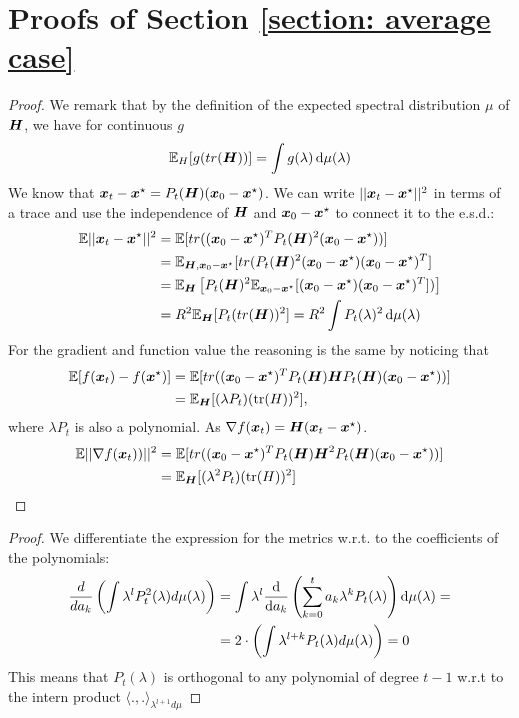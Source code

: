 \documentclass{article}
\begin{document}
\appendix
\newpage
\section{Proofs of Section \ref{section: average case}}

\metrics*
\begin{proof}
\newcommand\xinit{\xx_0-\xx^\star}
We remark that by the definition of the expected spectral distribution $\mu$ of ${\boldsymbol H}$, we have for continuous $g$
\begin{equation}
    {\mathbb{E}}_H[g(tr({\boldsymbol H}))]=\int g(\lambda)\mathop{}\!\mathrm{d} \mu(\lambda) 
\end{equation}
We know that $\xx_t-\xx^\star=P_t(\HH)(\xinit)$. We can write $||{\boldsymbol x}_t-{\boldsymbol x}^\star||^2$ in terms of a trace and use the independence of ${\boldsymbol H}$ and $\xinit$ to connect it to the e.s.d.:
\begin{align}
    \mathbb{E}||\xx_t-\xx^\star||^2&=\EE[ tr((\xinit)^TP_t(\HH)^2(\xinit))] \\
    &=\EE_{\HH,\xinit} [tr(P_t(\HH)^2(\xinit)(\xinit)^T]\\
    &=\EE_\HH\left[P_t(\HH)^2\EE_{\xinit}[(\xinit)(\xinit)^T])\right]  \\
    &=R^2\EE_\HH[P_t(tr(\HH))^2]=R^2 \int P_t(\lambda)^2\dif\mu(\lambda)
\end{align}
For the gradient and function value the reasoning is the same by noticing that
\begin{align}
    \EE[f(\xx_t)-f(\xx^\star)]&=\EE[ tr((\xinit)^TP_t(\HH)\HH P_t(\HH)(\xinit))]\\
    &=\EE_\HH[(\lambda P_t)(\tr(H))^2],
\end{align}
where $\lambda P_t$ is also a  polynomial. As $\nabla f({\boldsymbol x}_t)={\boldsymbol H}({\boldsymbol x}_t-{\boldsymbol x}^\star)$.
\begin{align}
    \EE||\nabla f(\xx_t))||^2&=\EE[ tr((\xinit)^TP_t(\HH)\HH^2 P_t(\HH)(\xinit))]\\
    &=\EE_\HH[(\lambda^2 P_t)(\tr(H))^2]
\end{align}


\end{proof}

\optimality*
\begin{proof}
We differentiate the expression for the metrics w.r.t. to the coefficients of the polynomials:
\begin{align*}
    \frac{d}{da_k}\left(\int \lambda^lP_t^2(\lambda)d\mu(\lambda)\right)&=\int\lambda^l\frac{\mathop{}\!\mathrm{d}}{\mathop{}\!\mathrm{d} a_k}\left(\sum_{k=0}^t a_k\lambda^kP_t(\lambda) \right) \mathop{}\!\mathrm{d} \mu(\lambda)=
    \\&=2\cdot\left(\int \lambda^{l+k}P_t(\lambda)d\mu(\lambda)\right)=0
\end{align*}
This means that $P_t(\lambda)$ is orthogonal to any polynomial of degree $t-1$  w.r.t to the intern product $\langle.,.\rangle_{\lambda^{l+1}d\mu}$

\end{proof}
\end{document}
